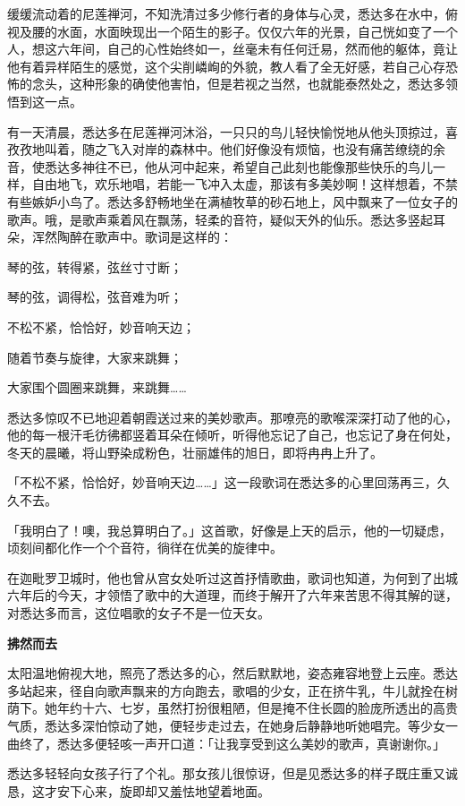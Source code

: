 \documentclass[twoside,openany]{book}
\newcommand{\mt}[1]{\textbullet \textbf{#1}}
\begin{document}
缓缓流动着的尼莲禅河，不知洗清过多少修行者的身体与心灵，悉达多在水中，俯视及腰的水面，水面映现出一个陌生的影子。仅仅六年的光景，自己恍如变了一个人，想这六年间，自己的心性始终如一，丝毫未有任何迁易，然而他的躯体，竟让他有着异样陌生的感觉，这个尖削嶙峋的外貌，教人看了全无好感，若自己心存恐怖的念头，这种形象的确使他害怕，但是若视之当然，也就能泰然处之，悉达多领悟到这一点。

有一天清晨，悉达多在尼莲禅河沐浴，一只只的鸟儿轻快愉悦地从他头顶掠过，喜孜孜地叫着，随之飞入对岸的森林中。他们好像没有烦恼，也没有痛苦缭绕的余音，使悉达多神往不已，他从河中起来，希望自己此刻也能像那些快乐的鸟儿一样，自由地飞，欢乐地唱，若能一飞冲入太虚，那该有多美妙啊！这样想着，不禁有些嫉妒小鸟了。悉达多舒畅地坐在满植牧草的砂石地上，风中飘来了一位女子的歌声。哦，是歌声乘着风在飘荡，轻柔的音符，疑似天外的仙乐。悉达多竖起耳朵，浑然陶醉在歌声中。歌词是这样的：

琴的弦，转得紧，弦丝寸寸断；

琴的弦，调得松，弦音难为听；

不松不紧，恰恰好，妙音响天边；

随着节奏与旋律，大家来跳舞；

大家围个圆圈来跳舞，来跳舞……

悉达多惊叹不已地迎着朝霞送过来的美妙歌声。那嘹亮的歌喉深深打动了他的心，他的每一根汗毛彷彿都竖着耳朵在倾听，听得他忘记了自己，也忘记了身在何处，冬天的晨曦，将山野染成粉色，壮丽雄伟的旭日，即将冉冉上升了。

「不松不紧，恰恰好，妙音响天边……」这一段歌词在悉达多的心里回荡再三，久久不去。

「我明白了！噢，我总算明白了。」这首歌，好像是上天的启示，他的一切疑虑，顷刻间都化作一个个音符，徜徉在优美的旋律中。

在迦毗罗卫城时，他也曾从宫女处听过这首抒情歌曲，歌词也知道，为何到了出城六年后的今天，才领悟了歌中的大道理，而终于解开了六年来苦思不得其解的谜，对悉达多而言，这位唱歌的女子不是一位天女。

\mt{拂然而去}

太阳温地俯视大地，照亮了悉达多的心，然后默默地，姿态雍容地登上云座。悉达多站起来，径自向歌声飘来的方向跑去，歌唱的少女，正在挤牛乳，牛儿就拴在树荫下。她年约十六、七岁，虽然打扮很粗陋，但是掩不住长圆的脸庞所透出的高贵气质，悉达多深怕惊动了她，便轻步走过去，在她身后静静地听她唱完。等少女一曲终了，悉达多便轻咳一声开口道：「让我享受到这么美妙的歌声，真谢谢你。」

悉达多轻轻向女孩子行了个礼。那女孩儿很惊讶，但是见悉达多的样子既庄重又诚恳，这才安下心来，旋即却又羞怯地望着地面。
\end{document}
